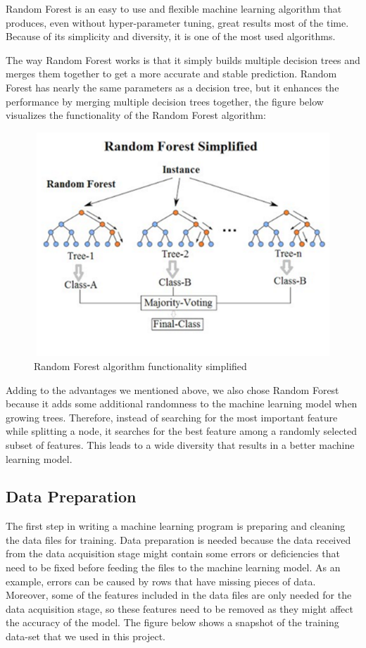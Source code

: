 \documentclass{article}
\begin{document}
Random Forest is an easy to use and flexible machine learning algorithm that produces, even without hyper-parameter tuning, great results most of the time. Because of its simplicity and diversity, it is one of the most used algorithms.\newline

The way Random Forest works is that it simply builds multiple decision trees and merges them together to get a more accurate and stable prediction. Random Forest has nearly the same parameters as a decision tree, but it enhances the performance by merging multiple decision trees together, the figure below visualizes the functionality of the Random Forest algorithm:\pagebreak

\begin{figure}[!ht]
    \centering
    \includegraphics[scale=0.5]{MLgraphs/randomForestSimple.png}
    \caption{Random Forest algorithm functionality simplified} 
\end{figure}

Adding to the advantages we mentioned above, we also chose Random Forest because it adds some additional randomness to the machine learning model when growing trees. Therefore, instead of searching for the most important feature while splitting a node, it searches for the best feature among a randomly selected subset of features. This leads to a wide diversity that results in a better machine learning model.

\subsection{Data Preparation}
The first step in writing a machine learning program is preparing and cleaning the data files for training. Data preparation is needed because the data received from the data acquisition stage might contain some errors or deficiencies that need to be fixed before feeding the files to the machine learning model. As an example, errors can be caused by rows that have missing pieces of data. Moreover, some of the features included in the data files are only needed for the data acquisition stage, so these features need to be removed as they might affect the accuracy of the model. The figure below shows a snapshot of the training data-set that we used in this project.\newline
\end{document}
